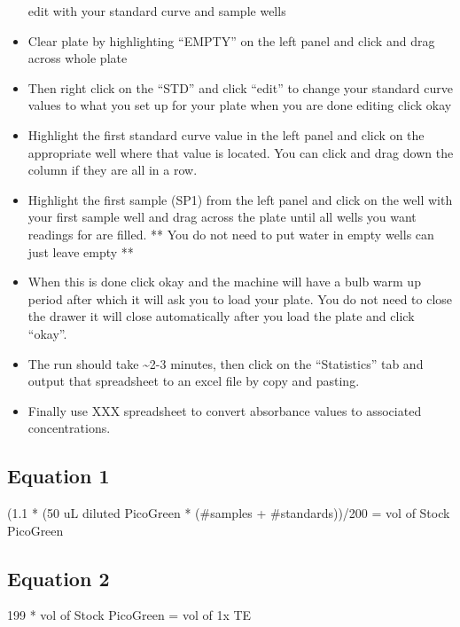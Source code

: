 \documentclass[
  letterpaper,
  DIV=11,
  numbers=noendperiod]{scrreprt}
\begin{document}
\begin{itemize}
  edit with your standard curve and sample wells
\item
  Clear plate by highlighting ``EMPTY'' on the left panel and click and
  drag across whole plate
\item
  Then right click on the ``STD'' and click ``edit'' to change your
  standard curve values to what you set up for your plate when you are
  done editing click okay
\item
  Highlight the first standard curve value in the left panel and click
  on the appropriate well where that value is located. You can click and
  drag down the column if they are all in a row.
\item
  Highlight the first sample (SP1) from the left panel and click on the
  well with your first sample well and drag across the plate until all
  wells you want readings for are filled. ** You do not need to put
  water in empty wells can just leave empty **
\item
  When this is done click okay and the machine will have a bulb warm up
  period after which it will ask you to load your plate. You do not need
  to close the drawer it will close automatically after you load the
  plate and click ``okay''.
\item
  The run should take \textasciitilde2-3 minutes, then click on the
  ``Statistics'' tab and output that spreadsheet to an excel file by
  copy and pasting.
\item
  Finally use XXX spreadsheet to convert absorbance values to associated
  concentrations.
\end{itemize}

\hypertarget{equation-1}{%
\subsection*{\texorpdfstring{\textbf{Equation
1}}{Equation 1}}\label{equation-1}}

(1.1 * (50 uL diluted PicoGreen * (\#samples + \#standards))/200 = vol
of Stock PicoGreen

\hypertarget{equation-2}{%
\subsection*{\texorpdfstring{\textbf{Equation
2}}{Equation 2}}\label{equation-2}}

199 * vol of Stock PicoGreen = vol of 1x TE
\end{document}
